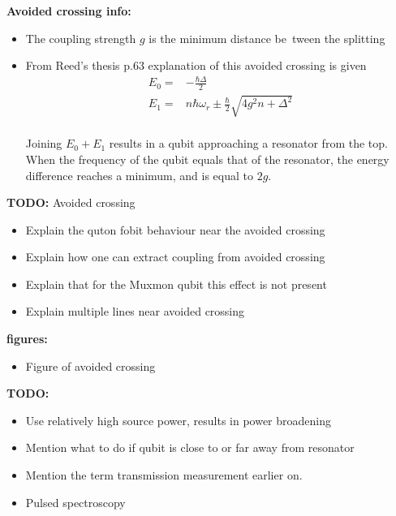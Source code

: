           \textbf{Avoided crossing info:}
          \begin{itemize}
            \item The coupling strength $g$ is the minimum distance be~tween the splitting
            \item From Reed's thesis p.63 explanation of this avoided crossing is given\\
            \begin{align}
             E_0 = & -\frac{\hbar \Delta}{2}\\
             E_1 = & n \hbar\omega_r \pm \frac{\hbar}{2}\sqrt{4g^2n + \Delta^2}
            \end{align}\\
            Joining $E_0 + E_1$ results in a qubit approaching a resonator from the top.\\
            When the frequency of the qubit equals that of the resonator, the energy difference reaches a minimum, and is equal to $2g$.
          \end{itemize}

          \textbf{TODO:} Avoided crossing
          \begin{itemize}
            \item Explain the quton fobit behaviour near the avoided crossing
            \item Explain how one can extract coupling from avoided crossing
            \item Explain that for the Muxmon qubit this effect is not present
            \item Explain multiple lines near avoided crossing
          \end{itemize}

          \textbf{figures:}
          \begin{itemize}
            \item Figure of avoided crossing
          \end{itemize}


        \textbf{TODO:}
        \begin{itemize}
          \item Use relatively high source power, results in power broadening
          \item Mention what to do if qubit is close to or far away from resonator
          \item Mention the term transmission measurement earlier on.
          \item Pulsed spectroscopy
        \end{itemize}

